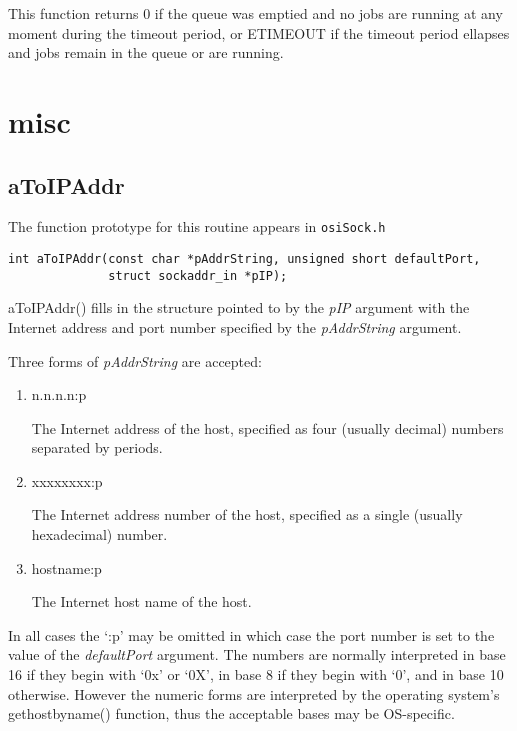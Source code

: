 This function returns 0 if the queue was emptied and no jobs are running at any moment during the timeout period,
or ETIMEOUT if the timeout period ellapses and jobs remain in the queue or are running.

\section{misc}

\subsection{aToIPAddr}

The function prototype for this routine appears in \verb|osiSock.h|

\begin{verbatim}
int aToIPAddr(const char *pAddrString, unsigned short defaultPort,
              struct sockaddr_in *pIP);
\end{verbatim}

aToIPAddr() fills in the structure pointed to by the \emph{pIP} argument with the Internet address and port number specified by the \emph{pAddrString} argument.

Three forms of \emph{pAddrString} are accepted:

\begin{enumerate}
\item n.n.n.n:p

The Internet address of the host, specified as four (usually decimal) numbers separated by periods.

\item xxxxxxxx:p

The Internet address number of the host, specified as a single (usually hexadecimal) number.

\item hostname:p

The Internet host name of the host.

\end{enumerate}

In all cases the `:p' may be omitted in which case the port number is set to the value of the \emph{defaultPort} argument.
The numbers are normally interpreted in base 16 if they begin with `0x' or `0X', in base 8 if they begin with `0', and in base 10 otherwise.
However the numeric forms are interpreted by the operating system's gethostbyname() function, thus the acceptable bases may be OS-specific.

